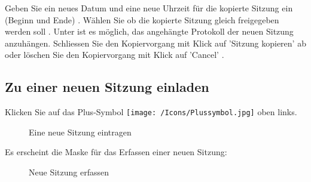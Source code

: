 Geben Sie ein neues Datum und eine neue Uhrzeit für die kopierte Sitzung ein (Beginn und Ende) . Wählen Sie ob die kopierte Sitzung gleich freigegeben werden soll . Unter  ist es möglich, das angehängte Protokoll der neuen Sitzung anzuhängen. Schliessen Sie den Kopiervorgang mit Klick auf 'Sitzung kopieren'  ab oder löschen  Sie den Kopiervorgang mit Klick auf 'Cancel' .


\subsection{Zu einer neuen Sitzung einladen}
\label{bkm:Ref434828480}

Klicken Sie auf das Plus-Symbol \texttt{[image: /Icons/Plussymbol.jpg]}  oben links.

\vspace{\baselineskip}

\begin{figure}[H]
\caption{Eine neue Sitzung eintragen}
\end{figure}

\pagebreak

Es erscheint die Maske für das Erfassen einer neuen Sitzung:

\begin{figure}[H]
\caption{Neue Sitzung erfassen}
\end{figure}

